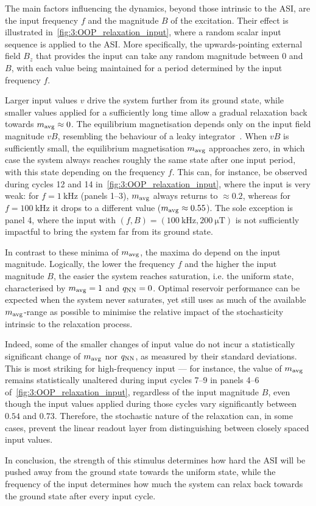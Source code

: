 The main factors influencing the dynamics, beyond those intrinsic to the ASI, are the input frequency $f$ and the magnitude $B$ of the excitation.
Their effect is illustrated in~\cref{fig:3:OOP_relaxation_input}, where a random scalar input sequence is applied to the ASI.
More specifically, the upwards-pointing external field $B_z$ that provides the input can take any random magnitude between 0 and $B$, with each value being maintained for a period determined by the input frequency $f$. \par %
Larger input values $v$ drive the system further from its ground state, while smaller values applied for a sufficiently long time allow a gradual relaxation back towards $m_\mathrm{avg} \approx 0$.
The equilibrium magnetisation depends only on the input field magnitude $vB$, resembling the behaviour of a leaky integrator~\cite{jaeger2001echo}.
When $vB$ is sufficiently small, the equilibrium magnetisation $m_\mathrm{avg}$ approaches zero, in which case the system always reaches roughly the same state after one input period, with this state depending on the frequency $f$.
This can, for instance, be observed during cycles 12 and 14 in~\cref{fig:3:OOP_relaxation_input}, where the input is very weak: for $f=\SI{1}{\kilo\hertz}$ (panels 1--3), $m_\mathrm{avg}$ always returns to $\approx 0.2$, whereas for $f=\SI{100}{\kilo\hertz}$ it drops to a different value ($m_\mathrm{avg} \approx 0.55$).
The sole exception is panel 4, where the input with $(f,B)=(\SI{100}{\kilo\hertz}, \SI{200}{\micro\tesla})$ is not sufficiently impactful to bring the system far from its ground state. \par
In contrast to these minima of $m_\mathrm{avg}$, the maxima do depend on the input magnitude.
Logically, the lower the frequency $f$ and the higher the input magnitude $B$, the easier the system reaches saturation, i.e. the uniform state, characterised by $m_\mathrm{avg}=1$ and $q_\mathrm{NN}=0$.
Optimal reservoir performance can be expected when the system never saturates, yet still uses as much of the available $m_\mathrm{avg}$-range as possible to minimise the relative impact of the stochasticity intrinsic to the relaxation process. \par
Indeed, some of the smaller changes of input value do not incur a statistically significant change of $m_\mathrm{avg}$ nor $q_\mathrm{NN}$, as measured by their standard deviations.
This is most striking for high-frequency input --- for instance, the value of $m_\mathrm{avg}$ remains statistically unaltered during input cycles 7--9 in panels 4--6 of~\cref{fig:3:OOP_relaxation_input}, regardless of the input magnitude $B$, even though the input values applied during those cycles vary significantly between $0.54$ and $0.73$.
Therefore, the stochastic nature of the relaxation can, in some cases, prevent the linear readout layer from distinguishing between closely spaced input values. \par
In conclusion, the strength of this stimulus determines how hard the ASI will be pushed away from the ground state towards the uniform state, while the frequency of the input determines how much the system can relax back towards the ground state after every input cycle.

